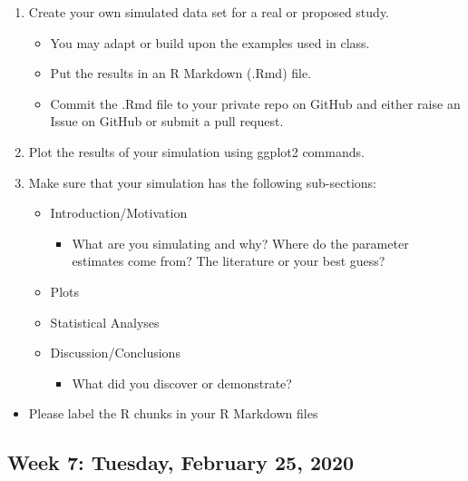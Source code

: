 \documentclass[
]{article}
\providecommand{\tightlist}{%
  \setlength{\itemsep}{0pt}\setlength{\parskip}{0pt}}
\begin{document}
\begin{enumerate}
\def\labelenumi{\arabic{enumi}.}
\tightlist
\item
  Create your own simulated data set for a real or proposed study.

  \begin{itemize}
  \tightlist
  \item
    You may adapt or build upon the examples used in class.
  \item
    Put the results in an R Markdown (.Rmd) file.
  \item
    Commit the .Rmd file to your private repo on GitHub and either raise
    an Issue on GitHub or submit a pull request.
  \end{itemize}
\item
  Plot the results of your simulation using ggplot2 commands.
\item
  Make sure that your simulation has the following sub-sections:

  \begin{itemize}
  \tightlist
  \item
    Introduction/Motivation

    \begin{itemize}
    \tightlist
    \item
      What are you simulating and why? Where do the parameter estimates
      come from? The literature or your best guess?
    \end{itemize}
  \item
    Plots
  \item
    Statistical Analyses
  \item
    Discussion/Conclusions

    \begin{itemize}
    \tightlist
    \item
      What did you discover or demonstrate?
    \end{itemize}
  \end{itemize}
\end{enumerate}

\begin{itemize}
\tightlist
\item
  Please label the R chunks in your R Markdown files
\end{itemize}

\hypertarget{week-7-tuesday-february-25-2020}{%
\subsection{Week 7: Tuesday, February 25,
2020}\label{week-7-tuesday-february-25-2020}}
\end{document}
